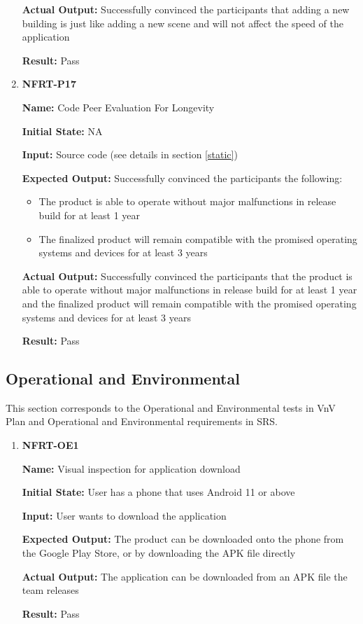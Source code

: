 \documentclass[12pt, titlepage]{article}
\begin{document}
\begin{enumerate}
\textbf{Actual Output:} Successfully convinced the participants that adding a new building is just like adding a new scene and will not affect the speed of the application

\textbf{Result:} Pass

\item \textbf{NFRT-P17}

\textbf{Name:} Code Peer Evaluation For Longevity

\textbf{Initial State:} NA

\textbf{Input:} Source code (see details in section \ref{static})

\textbf{Expected Output:} Successfully convinced the participants the following:
\begin{itemize} 
  \item The product is able to operate without major malfunctions in release build for at least 1 year
  \item The finalized product will remain compatible with the promised operating systems and devices for at least 3 years
\end{itemize}

\textbf{Actual Output:} Successfully convinced the participants that the product is able to operate without major malfunctions in release build for at least 1 year and the finalized product will remain compatible with the promised operating systems and devices for at least 3 years

\textbf{Result:} Pass
\end{enumerate}
\subsection{Operational and Environmental}
This section corresponds to the Operational and Environmental tests in VnV Plan and Operational and Environmental requirements in SRS.
\begin{enumerate}
\item \textbf{NFRT-OE1}

\textbf{Name:} Visual inspection for application download

\textbf{Initial State:} User has a phone that uses Android 11 or above

\textbf{Input:} User wants to download the application

\textbf{Expected Output:} The product can be downloaded onto the phone from the Google Play Store, or by downloading the APK file directly

\textbf{Actual Output:} The application can be downloaded from an APK file the team releases

\textbf{Result:} Pass
\end{enumerate}
\end{document}
